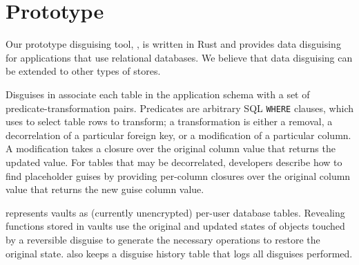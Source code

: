 \section{Prototype}
\label{sec:proto}
%
Our prototype disguising tool, \sys, is written in Rust and 
provides data disguising for applications that use relational databases.
%
We believe that data disguising can be extended to other types of stores.
%

Disguises in \sys associate each table in the application schema with a set of
predicate-transformation pairs. Predicates are arbitrary SQL \texttt{WHERE} clauses, which \sys uses
to select table rows to transform; a transformation is either a removal, a decorrelation of a
particular foreign key, or a modification of a particular column. A modification takes a
closure over the original column value that returns the updated value.
%
For tables that may be decorrelated, developers describe how to find placeholder guises
by providing per-column closures over the original column value
that returns the new guise column value.

%
\sys represents vaults as (currently unencrypted) per-user database tables. Revealing functions
stored in vaults use the original and updated states of objects touched by a reversible disguise to
generate the necessary operations to restore the original state. \sys also keeps a disguise history
table that logs all disguises performed. 

\iffalse
\sys also provides a specification of the end-state after it applies a sequence of
disguises; this allows developers to double-check that their disguises achieve their privacy
transformation goals.
%
To do so, \sys automatically generates a sequence of materialized view filters that, when applied on top of each
other, correspond to the state achieved by composing the disguises. 
Developers specify assertions (\eg all objects belonging to departing user Bob have
been removed) that \sys ensures holds on the materialized view specification.

\sys's composition technique may reorder filters from one disguise with those from a subsequent disguise in order to achieve the
correct result.
%
\sys maps these filters directly to physical database operations (where reordering filters corresponds to
temporarily undoing vault entries). Thus, the developer can use the materialized view filters as a way to
test the correctness of \sys and their disguises prior to permanently altering the application database. 
\fi
